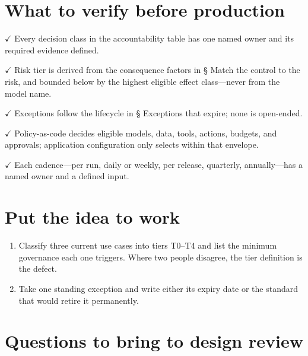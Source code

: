 \section{What to verify before production}

\textbf{\ensuremath{\checkmark}} Every decision class in the accountability table has one named owner and its required evidence defined.\par

\textbf{\ensuremath{\checkmark}} Risk tier is derived from the consequence factors in § Match the control to the risk, and bounded below by the highest eligible effect class—never from the model name.\par

\textbf{\ensuremath{\checkmark}} Exceptions follow the lifecycle in § Exceptions that expire; none is open-ended.\par

\textbf{\ensuremath{\checkmark}} Policy-as-code decides eligible models, data, tools, actions, budgets, and approvals; application configuration only selects within that envelope.\par

\textbf{\ensuremath{\checkmark}} Each cadence—per run, daily or weekly, per release, quarterly, annually—has a named owner and a defined input.\par

\section{Put the idea to work}

\begin{enumerate}

\item Classify three current use cases into tiers T0–T4 and list the minimum governance each one triggers. Where two people disagree, the tier definition is the defect.

\item Take one standing exception and write either its expiry date or the standard that would retire it permanently.

\end{enumerate}

\section{Questions to bring to design review}


